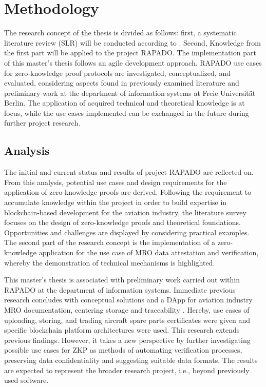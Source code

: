 \chapter{Methodology}
The research concept of the thesis is divided as follows: first, a systematic literature review (SLR) will be conducted according to \cite{HevnerAR2004DSiI, vomBrockeJan2019TDgs, Webster2002AnalyzingTP}. Second, Knowledge from the first part will be applied to the project RAPADO. The implementation part of this master's thesis follows an agile development approach. RAPADO use cases for zero-knowledge proof protocols are investigated, conceptualized, and evaluated, considering aspects found in previously examined literature and preliminary work at the department of information systems at Freie Universit{\"a}t Berlin. The application of acquired technical and theoretical knowledge is at focus, while the use cases implemented can be exchanged in the future during further project research. 

\section{Analysis}
The initial and current status and results of project RAPADO are reflected on. From this analysis, potential use cases and design requirements for the application of zero-knowledge proofs are derived. Following the requirement to accumulate knowledge within the project in order to build expertise in blockchain-based development for the aviation industry, the literature survey focuses on the design of zero-knowledge proofs and theoretical foundations. Opportunities and challenges are displayed by considering practical examples. The second part of the research concept is the implementation of a zero-knowledge application for the use case of MRO data attestation and verification, whereby the demonstration of technical mechanisms is highlighted.

This master's thesis is associated with preliminary work carried out within RAPADO at the department of information systems. Immediate previous research concludes with conceptual solutions and a DApp for aviation industry MRO documentation, centering storage and traceability \citep{ZedelJ, semesterproject}. Hereby, use cases of uploading, storing, and trading aircraft spare parts certificates were given and specific blockchain platform architectures were used. This research extends previous findings. However, it takes a new perspective by further investigating possible use cases for ZKP as methods of automating verification processes, preserving data confidentiality and suggesting suitable data formats. The results are expected to represent the broader research project, i.e., beyond previously used software.

